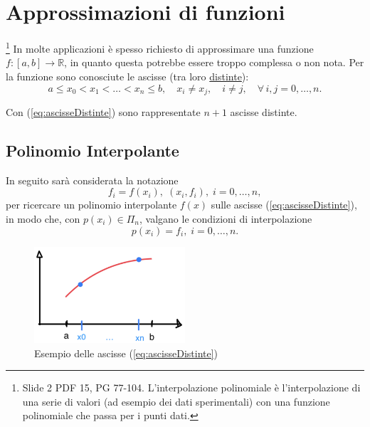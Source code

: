 \section{Approssimazioni di funzioni}
\footnote{Slide 2 PDF 15, PG 77-104. L'interpolazione polinomiale è l'interpolazione di una serie di valori (ad esempio dei dati sperimentali) con una funzione polinomiale che passa per i punti dati.}
In molte applicazioni è spesso richiesto di approssimare una funzione $f:[a,b]\rightarrow\mathbb R$, in quanto questa potrebbe essere troppo complessa o non nota. Per la funzione sono conosciute le ascisse (tra loro \underline{distinte}):
\begin{equation}\label{eq:ascisseDistinte}
a\leq x_0<x_1<\hdots<x_n\leq b,\quad x_i\neq x_j, \quad i\neq j, \quad \forall\, i,j=0,\hdots,n.
\end{equation}

Con (\ref{eq:ascisseDistinte}) sono rappresentate $n+1$ ascisse distinte.

\subsection{Polinomio Interpolante}
In seguito sarà considerata la notazione
\begin{equation*}
    f_i=f(x_i),\; (x_i,f_i),\; i=0,\hdots,n,
\end{equation*}
per ricercare un polinomio interpolante $f(x)$ sulle ascisse (\ref{eq:ascisseDistinte}), in modo che, con $p(x_i)\in \Pi_n$, valgano le condizioni di interpolazione 
\begin{equation}\label{eq:condInterp}
    p(x_i)=f_i,\; i=0,\hdots,n.
\end{equation}
\begin{figure}
\centering
\includegraphics[width=0.5\textwidth]{immagini/GraficoAscisseInterpolazione.png}
\caption{\label{fig:GraficoAscisseInterp} Esempio delle ascisse (\ref{eq:ascisseDistinte})}
\end{figure}

